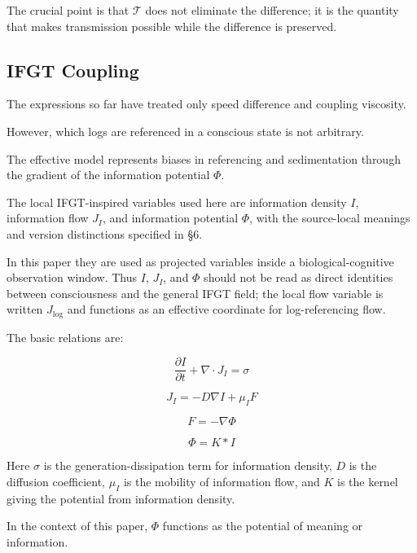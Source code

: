 The crucial point is that $\mathcal{T}$ does not eliminate the difference; it is the quantity that makes transmission possible while the difference is preserved.

\subsection{IFGT Coupling}


The expressions so far have treated only speed difference and coupling viscosity.

However, which logs are referenced in a conscious state is not arbitrary.

The effective model represents biases in referencing and sedimentation through the gradient of the information potential $\Phi$.

The local IFGT-inspired variables used here are information density $I$, information flow $J_I$, and information potential $\Phi$, with the source-local meanings and version distinctions specified in §6.

In this paper they are used as projected variables inside a biological-cognitive observation window. Thus $I$, $J_I$, and $\Phi$ should not be read as direct identities between consciousness and the general IFGT field; the local flow variable is written $J_{\log}$ and functions as an effective coordinate for log-referencing flow.

The basic relations are:

\begin{equation}
\frac{\partial I}{\partial t} + \nabla \cdot J_I = \sigma
\end{equation}

\begin{equation}
J_I = -D \nabla I + \mu_I F
\end{equation}

\begin{equation}
F = -\nabla \Phi
\end{equation}

\begin{equation}
\Phi = K * I
\end{equation}

Here $\sigma$ is the generation-dissipation term for information density, $D$ is the diffusion coefficient, $\mu_I$ is the mobility of information flow, and $K$ is the kernel giving the potential from information density.

In the context of this paper, $\Phi$ functions as the potential of meaning or information.

